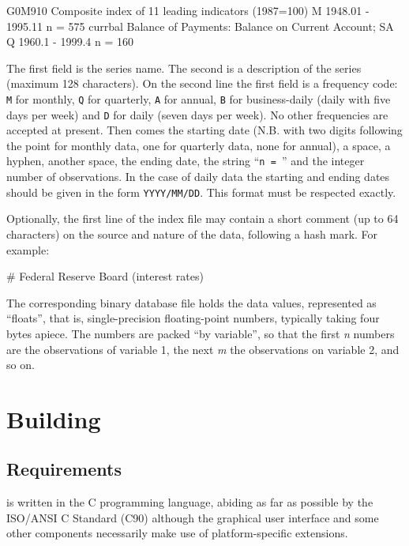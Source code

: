 \begin{code}
G0M910  Composite index of 11 leading indicators (1987=100) 
M 1948.01 - 1995.11  n = 575
currbal Balance of Payments: Balance on Current Account; SA 
Q 1960.1 - 1999.4 n = 160
\end{code}

The first field is the series name.  The second is a description of
the series (maximum 128 characters).  On the second line the first
field is a frequency code: \verb+M+ for monthly, \verb+Q+ for
quarterly, \verb+A+ for annual, \verb+B+ for business-daily (daily
with five days per week) and \verb+D+ for daily (seven days per week).
No other frequencies are accepted at present.  Then comes the starting
date (N.B. with two digits following the point for monthly data, one
for quarterly data, none for annual), a space, a hyphen, another
space, the ending date, the string ``\verb+n = +'' and the integer
number of observations. In the case of daily data the starting and
ending dates should be given in the form \verb+YYYY/MM/DD+. This
format must be respected exactly.

Optionally, the first line of the index file may contain a short
comment (up to 64 characters) on the source and nature of the data,
following a hash mark.  For example:

\begin{code}
# Federal Reserve Board (interest rates)
\end{code}

The corresponding binary database file holds the data values,
represented as ``floats'', that is, single-precision floating-point
numbers, typically taking four bytes apiece.  The numbers are packed
``by variable'', so that the first \emph{n} numbers are the
observations of variable 1, the next \emph{m} the observations on
variable 2, and so on.



\chapter{Building }
\label{app-build}

\section{Requirements}
\label{sec:build-req}

 is written in the C programming language, abiding as far
as possible by the ISO/ANSI C Standard (C90) although the graphical
user interface and some other components necessarily make use of
platform-specific extensions.
  
